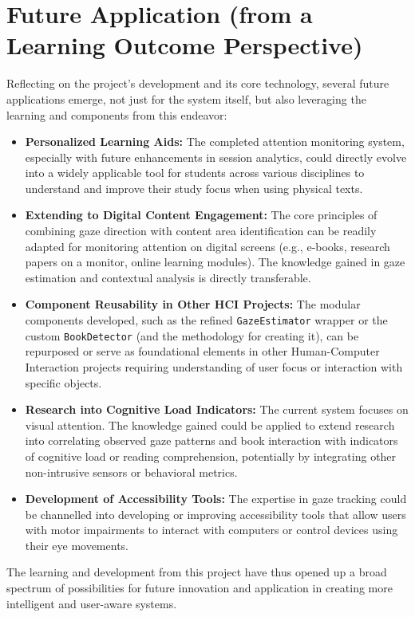 \section{Future Application (from a Learning Outcome Perspective)}
Reflecting on the project's development and its core technology, several future applications emerge, not just for the system itself, but also leveraging the learning and components from this endeavor:
\begin{itemize}
    \item \textbf{Personalized Learning Aids:} The completed attention monitoring system, especially with future enhancements in session analytics, could directly evolve into a widely applicable tool for students across various disciplines to understand and improve their study focus when using physical texts.
    \item \textbf{Extending to Digital Content Engagement:} The core principles of combining gaze direction with content area identification can be readily adapted for monitoring attention on digital screens (e.g., e-books, research papers on a monitor, online learning modules). The knowledge gained in gaze estimation and contextual analysis is directly transferable.
    \item \textbf{Component Reusability in Other HCI Projects:} The modular components developed, such as the refined \texttt{GazeEstimator} wrapper or the custom \texttt{BookDetector} (and the methodology for creating it), can be repurposed or serve as foundational elements in other Human-Computer Interaction projects requiring understanding of user focus or interaction with specific objects.
    \item \textbf{Research into Cognitive Load Indicators:} The current system focuses on visual attention. The knowledge gained could be applied to extend research into correlating observed gaze patterns and book interaction with indicators of cognitive load or reading comprehension, potentially by integrating other non-intrusive sensors or behavioral metrics.
    \item \textbf{Development of Accessibility Tools:} The expertise in gaze tracking could be channelled into developing or improving accessibility tools that allow users with motor impairments to interact with computers or control devices using their eye movements.
\end{itemize}
The learning and development from this project have thus opened up a broad spectrum of possibilities for future innovation and application in creating more intelligent and user-aware systems.